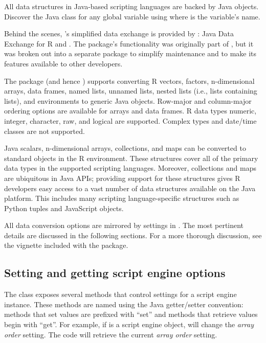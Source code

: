 All data structures in Java-based scripting languages are backed by Java objects. Discover the Java class for any global variable using   where  is the variable's name.

Behind the scenes, 's simplified data exchange is provided by : Java Data Exchange for R and . The  package's functionality was originally part of , but it was broken out into a separate package to simplify maintenance and to make its features available to other developers.

The  package (and hence ) supports converting R vectors, factors, n-dimensional arrays, data frames, named lists, unnamed lists, nested lists (i.e., lists containing lists), and environments to generic Java objects. Row-major and column-major ordering options are available for arrays and data frames. R data types numeric, integer, character, raw, and logical are supported. Complex types and date/time classes are not supported.

Java scalars, n-dimensional arrays, collections, and maps can be converted to standard objects in the R environment. These structures cover all of the primary data types in the supported scripting languages. Moreover, collections and maps are ubiquitous in Java APIs; providing support for these structures gives R developers easy access to a vast number of data structures available on the Java platform. This includes many scripting language-specific structures such as Python tuples and JavaScript objects.

All  data conversion options are mirrored by settings in . The most pertinent details are discussed in the following sections. For a more thorough discussion, see the vignette included with the  package.

\subsection{Setting and getting script engine options}

The   class exposes several methods that control settings for a script engine instance. These methods are named using the Java getter/setter convention: methods that set values are prefixed with ``set'' and methods that retrieve values begin with ``get''. For example, if  is a script engine object,  will change the \textit{array order} setting. The code  will retrieve the current \textit{array order} setting.

